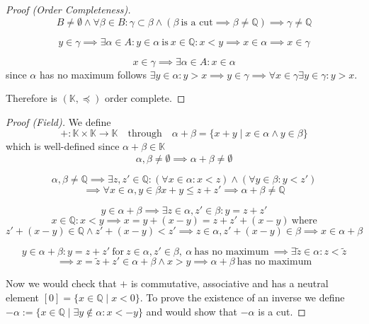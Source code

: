 \begin{proof}[Proof (Order Completeness)]
   \[B \neq \emptyset \land \forall \beta \in B: \gamma \subset \beta \land (\beta~\text{is a cut} \implies \beta \neq \mathbb{Q}) \implies \gamma \neq \mathbb{Q}\]

   \[y \in \gamma \implies \exists \alpha \in A: y \in \alpha~\text{is}~x \in \mathbb{Q}: x < y \implies x \in \alpha \implies x \in \gamma\]

   \[x \in \gamma \implies \exists \alpha \in A: x \in \alpha\]
   since \(\alpha\) has no maximum follows \(\exists y \in \alpha: y > x \implies y \in \gamma \implies \forall x \in \gamma \exists y \in \gamma: y > x\).

   Therefore is \((\mathbb{K}, \preceq)\) order complete.
\end{proof}
\begin{proof}[Proof (Field)]
   We define
   \[+: \mathbb{K} \times \mathbb{K} \to \mathbb{K} \quad\text{through}\quad \alpha + \beta = \{x + y \mid x \in \alpha \land y \in \beta\}\]
   which is well-defined since \(\alpha + \beta \in \mathbb{K}\)
   \[\alpha, \beta \neq \emptyset \implies \alpha + \beta \neq \emptyset\]

   \[\alpha, \beta \neq \mathbb{Q} \implies \exists z, z' \in \mathbb{Q}: (\forall x \in \alpha: x < z) \land (\forall y \in \beta: y < z')\]
   \[\implies \forall x \in \alpha, y \in \beta x + y \leq z + z' \implies \alpha + \beta \neq \mathbb{Q}\]

   \[y \in \alpha + \beta \implies \exists z \in \alpha, z' \in \beta: y = z + z'\]
   \[x \in \mathbb{Q}: x < y \implies x = y + (x - y) = z + z' + (x -y)~\text{where}\]
   \[z' + (x -y) \in \mathbb{Q} \land z' + (x - y) < z' \implies z \in \alpha, z' + (x -y) \in \beta \implies x \in \alpha + \beta\]

   \[y \in \alpha + \beta: y = z + z'~\text{for}~z \in \alpha, z' \in \beta,~\alpha~\text{has no maximum}~\implies \exists \widetilde{z} \in \alpha: z < \tilde{z}\]
   \[\implies x = \widetilde{z} + z' \in \alpha + \beta \land x > y \implies \alpha + \beta~\text{has no maximum}\]

   Now we would check that \(+\) is commutative, associative and has a neutral element \([0] = \{x \in \mathbb{Q} \mid x < 0\}\).
   To prove the existence of an inverse we define \(-\alpha := \{x \in \mathbb{Q} \mid \exists y \not\in \alpha: x < -y\}\) and would show that \(-\alpha\) is a cut.


\end{proof}
